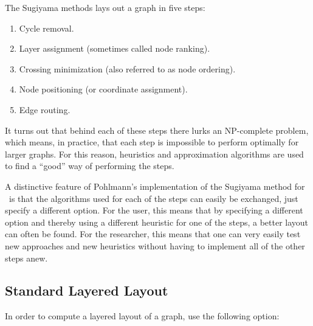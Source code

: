 The Sugiyama methods lays out a graph in five steps:
\begin{enumerate}
\item Cycle removal.
\item Layer assignment (sometimes called node ranking).
\item Crossing minimization (also referred to as node ordering).
\item Node positioning (or coordinate assignment).
\item Edge routing.
\end{enumerate}
It turns out that behind each of these steps there lurks an
NP-complete problem, which means, in practice, that each step is
impossible to perform optimally for larger graphs. For this reason,
heuristics and approximation algorithms are used to find a ``good''
way of performing the steps.

A distinctive feature of Pohlmann's implementation of the Sugiyama
method for \tikzname\ is that the algorithms used for each of the
steps can easily be exchanged, just specify a different option. For
the user, this means that by specifying a different 
option and thereby using a different heuristic for one of the steps, a
better layout can often be found. For the researcher, this means that
one can very easily test new approaches and new heuristics without
having to implement all of the other steps anew. 



\subsection{Standard Layered Layout}

In order to compute a layered layout of a graph, use the following option:

